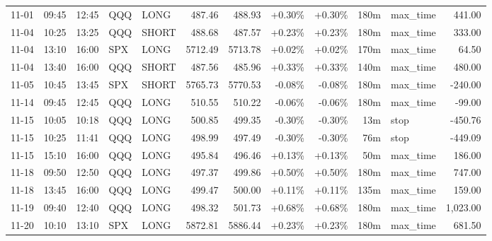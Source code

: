 \documentclass[11pt,a4paper,twoside]{article}
\begin{document}
\begin{center}
\begin{longtable}{>{\color{txtmain}}l l l l l r r r r r >{\color{txtmain}}l r}
11-01 & 09:45 & 12:45 & QQQ & LONG & 487.46 & 488.93 & \textcolor{wingreen}{+0.30\%} & \textcolor{wingreen}{+0.30\%} & 180m & max\_time & \textcolor{wingreen}{441.00} \\
11-04 & 10:25 & 13:25 & QQQ & SHORT & 488.68 & 487.57 & \textcolor{wingreen}{+0.23\%} & \textcolor{wingreen}{+0.23\%} & 180m & max\_time & \textcolor{wingreen}{333.00} \\
11-04 & 13:10 & 16:00 & SPX & LONG & 5712.49 & 5713.78 & \textcolor{wingreen}{+0.02\%} & \textcolor{wingreen}{+0.02\%} & 170m & max\_time & \textcolor{wingreen}{64.50} \\
11-04 & 13:40 & 16:00 & QQQ & SHORT & 487.56 & 485.96 & \textcolor{wingreen}{+0.33\%} & \textcolor{wingreen}{+0.33\%} & 140m & max\_time & \textcolor{wingreen}{480.00} \\
11-05 & 10:45 & 13:45 & SPX & SHORT & 5765.73 & 5770.53 & \textcolor{lossred}{-0.08\%} & \textcolor{lossred}{-0.08\%} & 180m & max\_time & \textcolor{lossred}{-240.00} \\
11-14 & 09:45 & 12:45 & QQQ & LONG & 510.55 & 510.22 & \textcolor{lossred}{-0.06\%} & \textcolor{lossred}{-0.06\%} & 180m & max\_time & \textcolor{lossred}{-99.00} \\
11-15 & 10:05 & 10:18 & QQQ & LONG & 500.85 & 499.35 & \textcolor{lossred}{-0.30\%} & \textcolor{lossred}{-0.30\%} & 13m & stop & \textcolor{lossred}{-450.76} \\
11-15 & 10:25 & 11:41 & QQQ & LONG & 498.99 & 497.49 & \textcolor{lossred}{-0.30\%} & \textcolor{lossred}{-0.30\%} & 76m & stop & \textcolor{lossred}{-449.09} \\
11-15 & 15:10 & 16:00 & QQQ & LONG & 495.84 & 496.46 & \textcolor{wingreen}{+0.13\%} & \textcolor{wingreen}{+0.13\%} & 50m & max\_time & \textcolor{wingreen}{186.00} \\
11-18 & 09:50 & 12:50 & QQQ & LONG & 497.37 & 499.86 & \textcolor{wingreen}{+0.50\%} & \textcolor{wingreen}{+0.50\%} & 180m & max\_time & \textcolor{wingreen}{747.00} \\
11-18 & 13:45 & 16:00 & QQQ & LONG & 499.47 & 500.00 & \textcolor{wingreen}{+0.11\%} & \textcolor{wingreen}{+0.11\%} & 135m & max\_time & \textcolor{wingreen}{159.00} \\
11-19 & 09:40 & 12:40 & QQQ & LONG & 498.32 & 501.73 & \textcolor{wingreen}{+0.68\%} & \textcolor{wingreen}{+0.68\%} & 180m & max\_time & \textcolor{wingreen}{1,023.00} \\
11-20 & 10:10 & 13:10 & SPX & LONG & 5872.81 & 5886.44 & \textcolor{wingreen}{+0.23\%} & \textcolor{wingreen}{+0.23\%} & 180m & max\_time & \textcolor{wingreen}{681.50} \\

\end{longtable}
\end{center}
\end{document}

